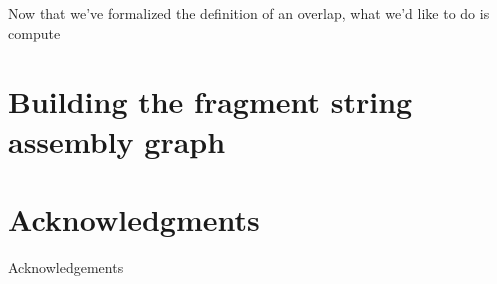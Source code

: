 \documentclass[10pt]{article}
\begin{document}
Now that we've formalized the definition of an overlap, what we'd like to do is
compute 

\section{Building the fragment string assembly graph}


\section*{Acknowledgments}

Acknowledgements



\end{document}

